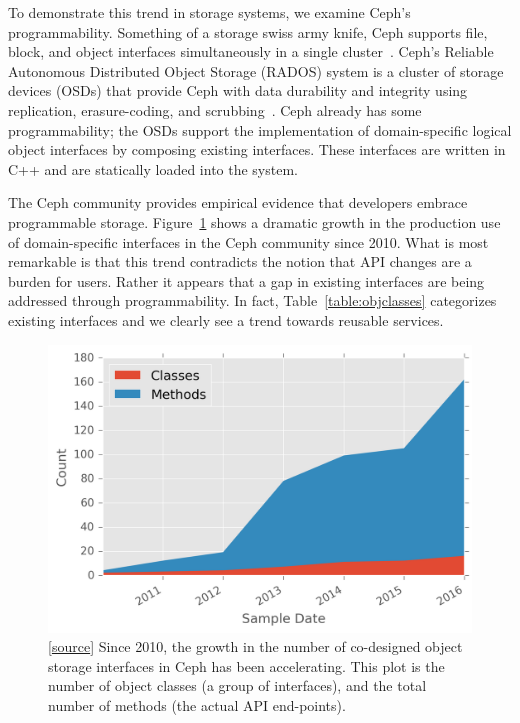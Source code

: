 \documentclass[preprint]{sigplanconf-eurosys}
\begin{document}
To demonstrate this trend in storage systems, we examine Ceph's
programmability. Something of a storage swiss army knife, Ceph supports file,
block, and object interfaces simultaneously in a single
cluster~\cite{ceph_contributors_ceph_2010}. Ceph's Reliable Autonomous
Distributed Object Storage (RADOS) system is a cluster of storage devices
(OSDs) that provide Ceph with data durability and integrity using replication,
erasure-coding, and scrubbing~\cite{weil_rados_2007}. Ceph already has some
programmability; the OSDs support the implementation of domain-specific logical
object interfaces by composing existing interfaces. These interfaces are
written in C++ and are statically loaded into the system.


The Ceph community provides empirical evidence that developers embrace
programmable storage. Figure~\ref{fig:obj-int-dev-growth} shows a dramatic
growth in the production use of domain-specific interfaces in the Ceph
community since 2010.  What is most remarkable is that this trend contradicts
the notion that API changes are a burden for users.  Rather it appears that a
gap in existing interfaces are being addressed through programmability. In
fact, Table~\ref{table:objclasses} categorizes existing interfaces and we
clearly see a trend towards reusable services.

\begin{figure}[ht]
\centering
\includegraphics{figures/obj-int-dev-growth.png}
\caption{[\href{https://github.com/double-blind-submitter/osdi16}{source}]
Since 2010, the growth in the number of co-designed object storage interfaces
in Ceph has been accelerating. This plot is the number of object classes (a
group of interfaces), and the total number of methods (the actual API
end-points).}
\label{fig:obj-int-dev-growth}
\end{figure}
\end{document}
